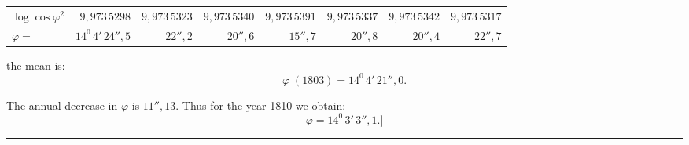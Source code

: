 \begin{landscape}
\begingroup
\small\setlength{\tabcolsep}{5pt}\renewcommand{\arraystretch}{1.18}
\begin{center}
\begin{tabular}{@{}lrrrrrrr@{}}
\(\log\cos\varphi^2\)&\(9{,}973\,5298\)&\(9{,}973\,5323\)&\(9{,}973\,5340\)&\(9{,}973\,5391\)&\(9{,}973\,5337\)&\(9{,}973\,5342\)&\(9{,}973\,5317\)\\
\(\varphi=\)&\(14^0\,4'\,24''{,}5\)&\(22''{,}2\)&\(20''{,}6\)&\(15''{,}7\)&\(20''{,}8\)&\(20''{,}4\)&\(22''{,}7\)
\end{tabular}
\end{center}
\endgroup
\par\noindent the mean is:
\[
\varphi\;(1803)=14^0\,4'\,21''{,}0.
\]
\par\noindent The annual decrease in \(\varphi\) is \(11''{,}13\). Thus for the year 1810 we obtain:
\[
\varphi=14^0\,3'\,3''{,}1.]
\]
\begin{center}\rule{.24\linewidth}{.4pt}\end{center}
\clearpage
\endgroup
\end{landscape}
